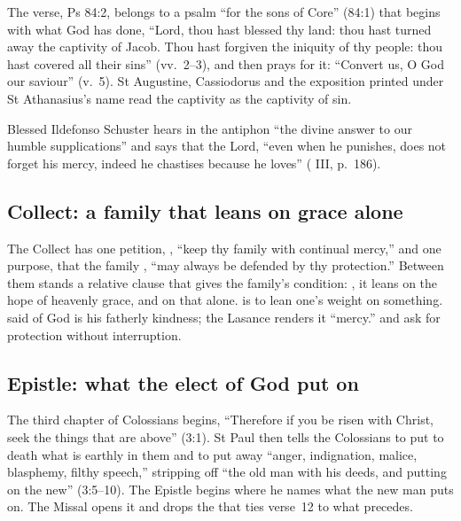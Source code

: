 The verse, Ps 84:2, belongs to a psalm ``for the sons of Core'' (84:1) that
begins with what God has done, ``Lord, thou hast blessed thy land: thou hast
turned away the captivity of Jacob. Thou hast forgiven the iniquity of thy
people: thou hast covered all their sins'' (vv.~2--3), and then prays for
it: ``Convert us, O God our saviour'' (v.~5). St Augustine, Cassiodorus and
the exposition printed under St Athanasius's name read the captivity as the
captivity of sin.

Blessed Ildefonso Schuster hears in the antiphon ``the divine answer to our
humble supplications'' and says that the Lord, ``even when he punishes, does
not forget his mercy, indeed he chastises because he loves'' ( III, p.~186).

\subsection{Collect: a family that leans on grace alone}
\label{sec:element-collect}

The Collect has one petition, , ``keep thy family with continual mercy,'' and one purpose, that the
family , ``may always be defended by
thy protection.'' Between them stands a relative clause that gives the
family's condition: , it
leans on the hope of heavenly grace, and on that alone.  is to
lean one's weight on something.  said of God is his
fatherly kindness; the Lasance renders it ``mercy.''  and
 ask for protection without interruption.

\subsection{Epistle: what the elect of God put on}
\label{sec:element-epistle}

The third chapter of Colossians begins, ``Therefore if you be risen with
Christ, seek the things that are above'' (3:1). St Paul then tells the
Colossians to put to death what is earthly in them and to put away ``anger,
indignation, malice, blasphemy, filthy speech,'' stripping off ``the old man
with his deeds, and putting on the new'' (3:5--10). The Epistle begins where
he names what the new man puts on. The Missal opens it  and
drops the  that ties verse~12 to what precedes.

